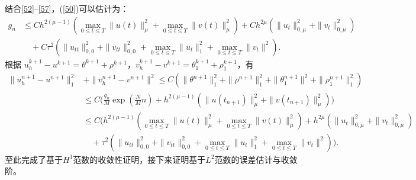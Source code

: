 \documentclass[twoside,UTF8]{nputhesis}
\begin{document}
结合\eqref{52}--\eqref{57}，(\ref{50})可以估计为：
\begin{equation*}
\begin{split}
g_n&\leq Ch^{2(\mu-1)}(\max\limits_{0\leq t\leq T}\| u(t)\|^2_\mu+\max\limits_{0\leq t\leq T}\| v(t)\|^2_\mu)+ Ch^{2\mu}(\| u_t\|^2_{0,\mu}+\| v_t\|^2_{0,\mu})\\
&\quad+C\tau^2(\| u_{tt}\|^2_{0,0}+\| v_{tt}\|^2_{0,0}+\max_{0\leq t\leq T}\| u_t\|^2_1+\max\limits_{0\leq t\leq T}\| v_t\|^2).
\label{65}
\end{split}
\end{equation*}
根据 $u^{k+1}_h-u^{k+1}=\theta^{k+1}+\rho^{k+1}$，$v^{k+1}_h-v^{k+1}=\theta_1^{k+1}+\rho_1^{k+1}$，有
\begin{equation*}
\begin{split}
\|u^{n+1}_h-u^{n+1}\|^2_1&+\| v^{n+1}_h-v^{n+1}\|^2\leq C(\|\theta^{n+1}\|^2_1+\|\rho^{n+1}\|^2_1+\|\theta^{n+1}_1\|^2+\|\rho^{n+1}_1\|^2_1)\\
&\leq C\Big(\frac{g_n}{M}\exp(\frac{N}{M}n)+h^{2(\mu-1)}(\|u(t_{n+1})\|^2_\mu+\|v(t_{n+1})\|^2_\mu)\Big)\\
&\leq C\Big(h^{2(\mu-1)}(\max\limits_{0\leq t\leq T}\| u(t)\|^2_\mu+\max\limits_{0\leq t\leq T}\| v(t)\|^2_\mu)+ h^{2\mu}(\| u_t\|^2_{0,\mu}+\| v_t\|^2_{0,\mu})\\
&\quad+\tau^2(\| u_{tt}\|^2_{0,0}+\| v_{tt}\|^2_{0,0}+\max_{0\leq t\leq T}\| u_t\|^2_1+\max\limits_{0\leq t\leq T}\| v_t\|^2)\Big).
\end{split}
\end{equation*}
至此完成了基于$H^1$范数的收敛性证明，接下来证明基于$L^2$范数的误差估计与收敛阶。
\end{document}
